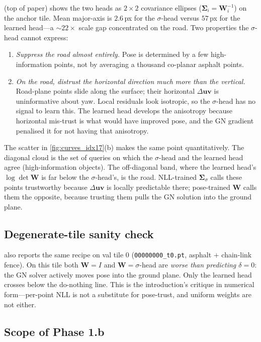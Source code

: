 \documentclass[10pt,conference,a4paper]{IEEEtran}
\newcommand{\Suv}{\Delta\mathbf{uv}}
\newcommand{\W}{\mathbf{W}}
\newcommand{\Sig}{\boldsymbol{\Sigma}}
\begin{document}
 (top of paper) shows the two heads as $2{\times}2$
covariance ellipses ($\Sig_i = \W_i^{-1}$) on the anchor tile.
Mean major-axis is $2.6\,$px for the $\sigma$-head versus $57\,$px for
the learned head---a $\sim 22\times$ scale gap concentrated on the
road. Two properties the $\sigma$-head cannot express:

\begin{enumerate}
\item \emph{Suppress the road almost entirely.} Pose is determined by a
  few high-information points, not by averaging a thousand co-planar
  asphalt points.
\item \emph{On the road, distrust the horizontal direction much more
  than the vertical.} Road-plane points slide along the surface; their
  horizontal $\Suv$ is uninformative about yaw. Local residuals look
  isotropic, so the $\sigma$-head has no signal to learn this. The
  learned head develops the anisotropy because horizontal mis-trust is
  what would have improved pose, and the GN gradient penalised it for
  not having that anisotropy.
\end{enumerate}

The scatter in \cref{fig:curves_idx17}(b) makes the same point
quantitatively. The diagonal cloud is the set of queries on which the
$\sigma$-head and the learned head agree (high-information objects).
The off-diagonal band, where the learned head's $\log\det\W$ is far
below the $\sigma$-head's, is the road. NLL-trained $\Sig_\sigma$
calls these points trustworthy because $\Suv$ is locally predictable
there; pose-trained $\W$ calls them the opposite, because trusting
them pulls the GN solution into the ground plane.

\subsection{Degenerate-tile sanity check}

 also reports the same recipe on val tile 0
(\texttt{00000000\_t0.pt}, asphalt + chain-link fence). On this tile
both $\W{=}I$ and $\W{=}\sigma$-head are \emph{worse than predicting
$\delta{=}0$}: the GN solver actively moves pose into the ground
plane. Only the learned head crosses below the do-nothing line. This
is the introduction's critique in numerical form---per-point NLL is
not a substitute for pose-trust, and uniform weights are not either.

\subsection{Scope of Phase 1.b}
\end{document}
